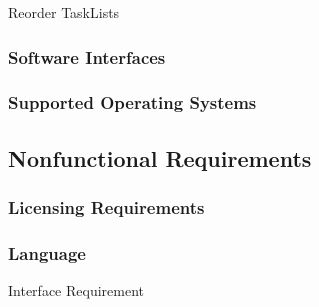     \begin{requirement}{Reorder TaskLists}
    \end{requirement}

	
	\subsubsection{Software Interfaces}
	\label{requirements:interfaces:software}



    \subsubsection{Supported Operating Systems}
    \label{requirements:os}

\subsection{Nonfunctional Requirements}
\label{requirements:functional}

    \subsubsection{Licensing Requirements}
    \label{requirements:license}


    \subsubsection{Language}
    \label{requirements:language}


    \begin{requirement}{Interface Requirement}
    \end{requirement}



